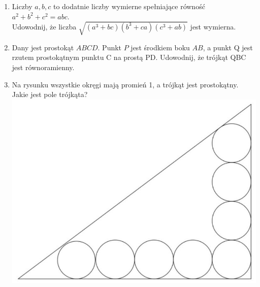 \documentclass[10pt]{article}
\begin{document}
\begin{enumerate}
  \item Liczby \(a, b, c\) to dodatnie liczby wymierne spełniające równość \(a^{2}+b^{2}+c^{2}=a b c\).\\
Udowodnij, że liczba \(\sqrt{\left(a^{3}+b c\right)\left(b^{3}+c a\right)\left(c^{3}+a b\right)}\) jest wymierna.
  \item Dany jest prostokąt \(A B C D\). Punkt \(P\) jest środkiem boku \(A B\), a punkt Q jest rzutem prostokątnym punktu C na prostą PD. Udowodnij, że trójkąt QBC jest równoramienny.
  \item Na rysunku wszystkie okręgi mają promień 1, a trójkąt jest prostokątny. Jakie jest pole trójkąta?\\
\includegraphics[max width=\textwidth, center]{2024_11_21_67112a28987ab362ffb2g-1}
\end{enumerate}
\end{document}
